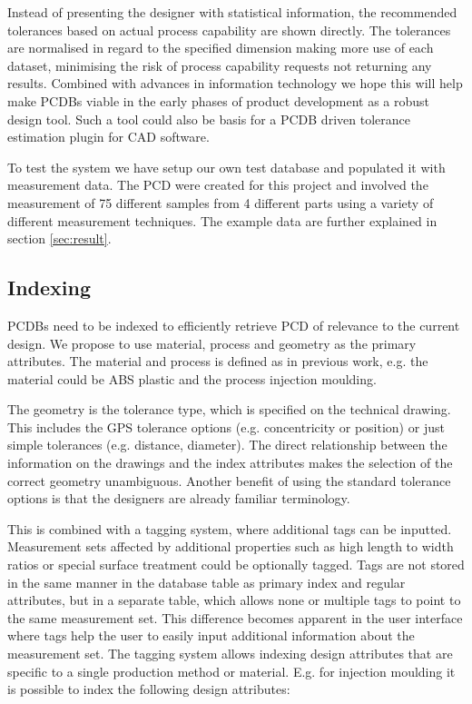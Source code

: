 \documentclass[aip,amsmath, reprint, author-year]{revtex4-1}
\begin{document}
Instead of presenting the designer with statistical information, the recommended tolerances based on actual process capability are shown directly. The tolerances are normalised in regard to the specified dimension making more use of each dataset, minimising the risk of process capability requests not returning any results. Combined with advances in information technology we hope this will help make PCDBs viable in the early phases of product development as a robust design tool. Such a tool could also be basis for a PCDB driven tolerance estimation plugin for CAD software.

To test the system we have setup our own test database and populated it with measurement data. The PCD were created for this project and involved the measurement of 75 different samples from 4 different parts using a variety of different measurement techniques. The example data are further explained in section \ref{sec:result}.

\subsection{Indexing}

PCDBs need to be indexed to efficiently retrieve PCD of relevance to the current design. We propose to use material, process and geometry as the primary attributes. The material and process is defined as in previous work, e.g. the material could be ABS plastic and the process injection moulding. 

The geometry is the tolerance type, which is specified on the technical drawing. This includes the GPS tolerance options (e.g. concentricity or position) or just simple tolerances (e.g. distance, diameter). The direct relationship between the information on the drawings and the index attributes makes the selection of the correct geometry unambiguous. Another benefit of using the standard tolerance options is that the designers are already familiar terminology. 

This is combined with a tagging system, where additional tags can be inputted. Measurement sets affected by additional properties such as high length to width ratios or special surface treatment could be optionally tagged. Tags are not stored in the same manner in the database table as primary index and regular attributes, but in a separate table, which allows none or multiple tags to point to the same measurement set. This difference becomes apparent in the user interface where tags help the user to easily input additional information about the measurement set. The tagging system allows indexing design attributes that are specific to a single production method or material. E.g. for injection moulding it is possible to index the following design attributes:
\end{document}
